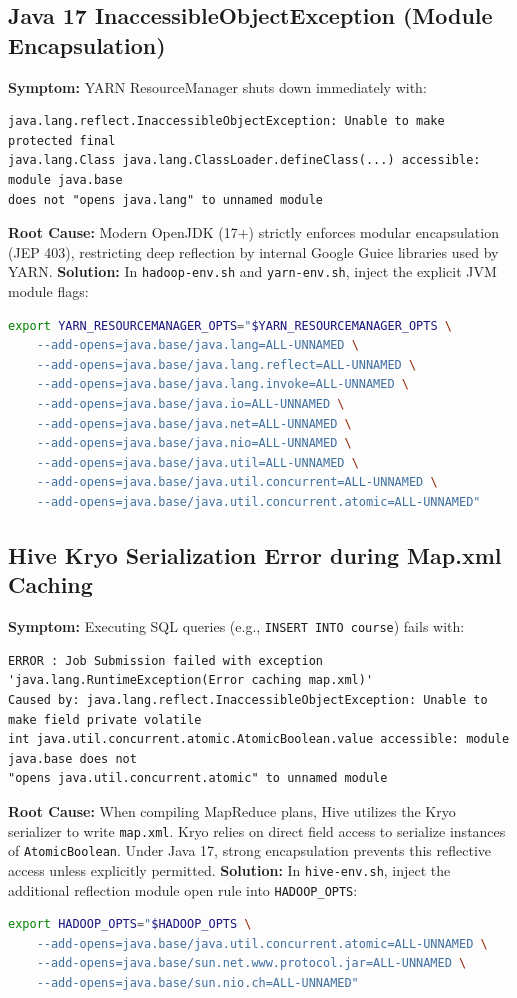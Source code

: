 \documentclass[11pt,a4paper]{article}
\begin{document}
\subsection{Java 17 InaccessibleObjectException (Module Encapsulation)}
\textbf{Symptom:} YARN ResourceManager shuts down immediately with:
\begin{verbatim}
java.lang.reflect.InaccessibleObjectException: Unable to make protected final
java.lang.Class java.lang.ClassLoader.defineClass(...) accessible: module java.base
does not "opens java.lang" to unnamed module
\end{verbatim}
\textbf{Root Cause:} Modern OpenJDK (17+) strictly enforces modular encapsulation (JEP 403), restricting deep reflection by internal Google Guice libraries used by YARN.
\textbf{Solution:} In \texttt{hadoop-env.sh} and \texttt{yarn-env.sh}, inject the explicit JVM module flags:
\begin{lstlisting}[language=bash, caption={Java 17 Add-Opens Injection}]
export YARN_RESOURCEMANAGER_OPTS="$YARN_RESOURCEMANAGER_OPTS \
    --add-opens=java.base/java.lang=ALL-UNNAMED \
    --add-opens=java.base/java.lang.reflect=ALL-UNNAMED \
    --add-opens=java.base/java.lang.invoke=ALL-UNNAMED \
    --add-opens=java.base/java.io=ALL-UNNAMED \
    --add-opens=java.base/java.net=ALL-UNNAMED \
    --add-opens=java.base/java.nio=ALL-UNNAMED \
    --add-opens=java.base/java.util=ALL-UNNAMED \
    --add-opens=java.base/java.util.concurrent=ALL-UNNAMED \
    --add-opens=java.base/java.util.concurrent.atomic=ALL-UNNAMED"
\end{lstlisting}

\subsection{Hive Kryo Serialization Error during Map.xml Caching}
\textbf{Symptom:} Executing SQL queries (e.g., \texttt{INSERT INTO course}) fails with:
\begin{verbatim}
ERROR : Job Submission failed with exception 'java.lang.RuntimeException(Error caching map.xml)'
Caused by: java.lang.reflect.InaccessibleObjectException: Unable to make field private volatile 
int java.util.concurrent.atomic.AtomicBoolean.value accessible: module java.base does not 
"opens java.util.concurrent.atomic" to unnamed module
\end{verbatim}
\textbf{Root Cause:} When compiling MapReduce plans, Hive utilizes the Kryo serializer to write \texttt{map.xml}. Kryo relies on direct field access to serialize instances of \texttt{AtomicBoolean}. Under Java 17, strong encapsulation prevents this reflective access unless explicitly permitted.
\textbf{Solution:} In \texttt{hive-env.sh}, inject the additional reflection module open rule into \texttt{HADOOP\_OPTS}:
\begin{lstlisting}[language=bash, caption={Hive Kryo Serialization Java 17 Fix}]
export HADOOP_OPTS="$HADOOP_OPTS \
    --add-opens=java.base/java.util.concurrent.atomic=ALL-UNNAMED \
    --add-opens=java.base/sun.net.www.protocol.jar=ALL-UNNAMED \
    --add-opens=java.base/sun.nio.ch=ALL-UNNAMED"
\end{lstlisting}
\end{document}
